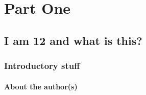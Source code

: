 \documentclass[11pt,fleqn]{book} %
\begin{document}


\pagestyle{empty} %

\tableofcontents %

\cleardoublepage %

\pagestyle{fancy} %


\part{Part One}



\chapter{I am 12 and what is this?}

\section{Introductory stuff}

\subsection{About the author(s)}
\end{document}
